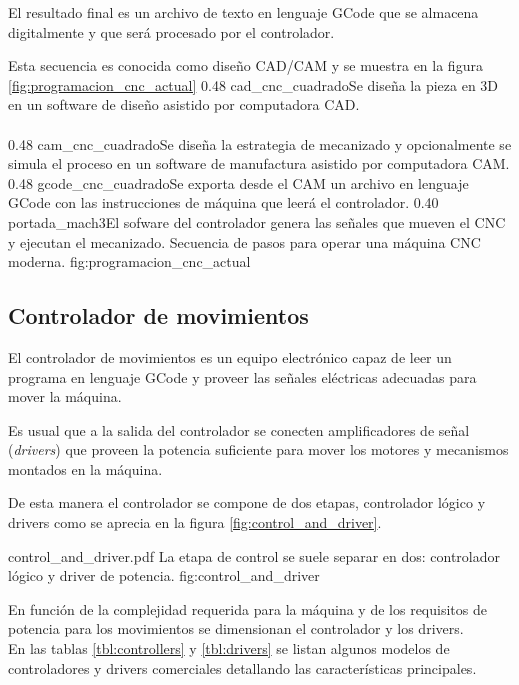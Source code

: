    El resultado final es un archivo de texto en lenguaje GCode que se almacena digitalmente y que será procesado por el controlador.\par
          Esta secuencia es conocida como diseño CAD/CAM y se muestra en la figura \ref{fig:programacion_cnc_actual}
\subfigtwotwo 
            {0.48 }{cad_cnc_cuadrado}{Se diseña la pieza en 3D en un software de diseño asistido por computadora CAD.\\ \vphantom{1}\\ \vphantom{1}}
            {0.48 }{cam_cnc_cuadrado}{Se diseña la estrategia de mecanizado y opcionalmente se simula el proceso en un software de manufactura asistido por computadora CAM.}
            {0.48 }{gcode_cnc_cuadrado}{Se exporta desde el CAM un archivo en lenguaje GCode con las instrucciones de máquina que leerá el controlador.}
            {0.40 }{portada_mach3}{El sofware del controlador genera las señales que mueven el CNC y ejecutan el mecanizado.}
            {Secuencia de pasos para operar una máquina CNC moderna.}
            {fig:programacion_cnc_actual}

\subsection{Controlador de movimientos}
El controlador de movimientos es un equipo electrónico capaz de leer un programa en lenguaje GCode y proveer las señales eléctricas adecuadas para mover la máquina.\par
Es usual que a la salida del controlador se conecten amplificadores de señal (\textit{drivers}) que proveen la potencia suficiente para mover los motores y mecanismos montados en la máquina.\par
De esta manera el controlador se compone de dos etapas, controlador lógico y drivers como se aprecia en la figura \ref{fig:control_and_driver}.

         {control_and_driver.pdf}
         {La etapa de control se suele separar en dos: controlador lógico y driver de potencia.}
         {fig:control_and_driver}

En función de la complejidad requerida para la máquina y de los requisitos de potencia para los movimientos se dimensionan el controlador y los drivers.\\
En las tablas \ref{tbl:controllers} y \ref{tbl:drivers} se listan algunos modelos de controladores y drivers comerciales detallando las características principales.\\

